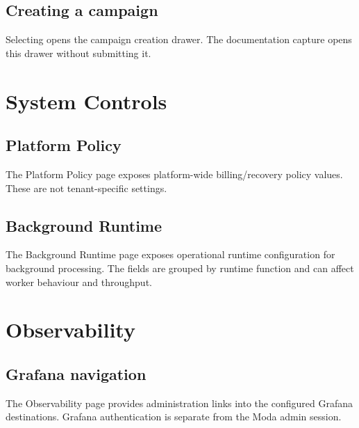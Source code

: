 \section{Creating a campaign}
Selecting  opens the campaign creation drawer. The documentation capture opens this drawer without submitting it.



\chapter{System Controls}

\section{Platform Policy}
The Platform Policy page exposes platform-wide billing/recovery policy values. These are not tenant-specific settings.


\section{Background Runtime}
The Background Runtime page exposes operational runtime configuration for background processing. The fields are grouped by runtime function and can affect worker behaviour and throughput.



\chapter{Observability}

\section{Grafana navigation}
The Observability page provides administration links into the configured Grafana destinations. Grafana authentication is separate from the Moda admin session.

